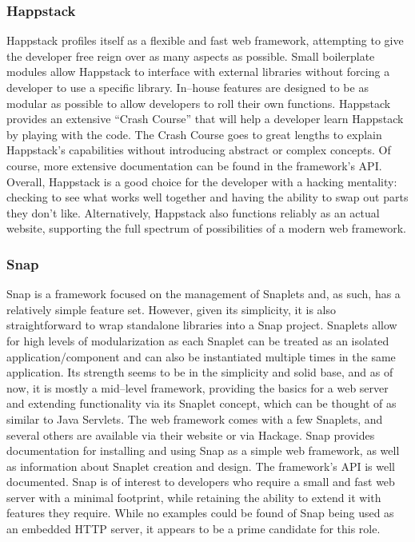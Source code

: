 \subsubsection{Happstack}
Happstack profiles itself as a flexible and fast web framework, attempting to give the developer free reign over as many aspects as possible.
Small boilerplate modules allow Happstack to interface with external libraries without forcing a developer to use a specific library.
In--house features are designed to be as modular as possible to allow developers to roll their own functions.
Happstack provides an extensive ``Crash Course'' \cite{HappstackCrashcourse} that will help a developer learn Happstack by playing with the code.
The Crash Course goes to great lengths to explain Happstack's capabilities without introducing abstract or complex concepts.
Of course, more extensive documentation can be found in the framework's API.
Overall, Happstack is a good choice for the developer with a hacking mentality: checking to see what works well together and having the ability to swap out parts they don't like.
Alternatively, Happstack also functions reliably as an actual website, supporting the full spectrum of possibilities of a modern web framework.

\subsubsection{Snap}
Snap is a framework focused on the management of Snaplets and, as such, has a relatively simple feature set.
However, given its simplicity, it is also straightforward to wrap standalone libraries into a Snap project.
Snaplets allow for high levels of modularization as each Snaplet can be treated as an isolated application/component and can also be instantiated multiple times in the same application.
Its strength seems to be in the simplicity and solid base, and as of now, it is mostly a mid--level framework, providing the basics for a web server and extending functionality via its Snaplet concept, which can be thought of as similar to Java Servlets.
The web framework comes with a few Snaplets, and several others are available via their website or via Hackage.
Snap provides documentation for installing and using Snap as a simple web framework, as well as information about Snaplet creation and design. 
The framework's API is well documented.
Snap is of interest to developers who require a small and fast web server with a minimal footprint, while retaining the ability to extend it with features they require.
While no examples could be found of Snap being used as an embedded HTTP server, it appears to be a prime candidate for this role.

